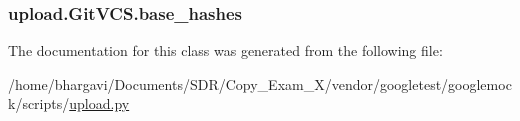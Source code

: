 \subsubsection[{\texorpdfstring{base\+\_\+hashes}{base_hashes}}]{\setlength{\rightskip}{0pt plus 5cm}upload.\+Git\+V\+C\+S.\+base\+\_\+hashes}\hypertarget{classupload_1_1_git_v_c_s_a07e9469050a157f34fe804cdf6ecddac}{}\label{classupload_1_1_git_v_c_s_a07e9469050a157f34fe804cdf6ecddac}


The documentation for this class was generated from the following file\+:\begin{DoxyCompactItemize}
\item 
/home/bhargavi/\+Documents/\+S\+D\+R/\+Copy\+\_\+\+Exam\+\_\+X/vendor/googletest/googlemock/scripts/\hyperlink{googlemock_2scripts_2upload_8py}{upload.\+py}\end{DoxyCompactItemize}
